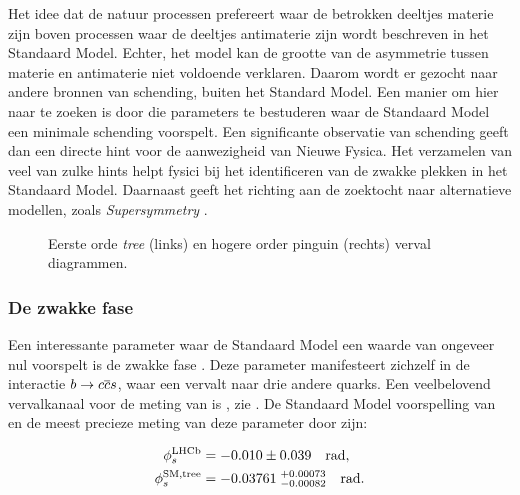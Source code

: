 Het idee dat de natuur processen prefereert waar de betrokken deeltjes materie zijn boven processen waar de deeltjes antimaterie zijn wordt beschreven in het Standaard Model. Echter, het model kan de grootte van de asymmetrie tussen materie en antimaterie niet voldoende verklaren. Daarom wordt er gezocht naar andere bronnen van \CP schending, buiten het Standard Model. Een manier om hier naar te zoeken is door  die parameters te bestuderen waar de Standaard Model een minimale \CP schending voorspelt. Een significante observatie van \CP schending geeft dan een directe hint voor de aanwezigheid van Nieuwe Fysica. Het verzamelen van veel van zulke hints helpt fysici bij het identificeren van de zwakke plekken in het Standaard Model. Daarnaast geeft het richting aan de zoektocht naar alternatieve modellen, zoals {\it Supersymmetry}  \eg \cite{Golfand:1971iw,Volkov:1973ix,Wess:1974tw}.


\begin{figure}[t]
  \begin{subfigure}{0.5\textwidth}
    \raggedright
    {\scalebox{1}{\sffamily }}
    \caption{}
    \label{app_jpsiphi_tree}
  \end{subfigure}%
  \hfill
  \begin{subfigure}{0.5\textwidth}
    \raggedleft
    {\scalebox{1}{\sffamily }}
    \caption{}
    \label{app_jpsiphi_peng}
  \end{subfigure}
     \caption{Eerste orde {\it tree} (links) en hogere order pinguin (rechts) \BsJpsiPhi verval diagrammen.}
  \label{app_jpsiphi_tree_peng}
\end{figure}



\subsubsection{De zwakke fase \phis}
Een interessante parameter waar de Standaard Model een waarde van ongeveer nul voorspelt is de zwakke fase \phis. Deze parameter manifesteert zichzelf in de interactie $b\rightarrow c\overline {c}s$, waar een \bquark vervalt naar drie andere quarks. Een veelbelovend vervalkanaal voor de meting van \phis is \BsJpsiPhi, zie . De Standaard Model voorspelling van \phis en de meest precieze meting van deze parameter door \lhcb zijn:

\begin{subequations}
  \label{app_phis_lhcb_theo}
  \begin{align}
  \centering
  \phiS{\lhcb}           &=  -0.010 \pm 0.039  \quad {\rm rad},
  \label{app_phis_lhcb}\\
  \phiS{SM,tree}  &= -0.03761 \; ^{+0.00073}_{-0.00082}  \quad {\rm rad}.
  \label{app_phis_theo}
\end{align}
\end{subequations}


